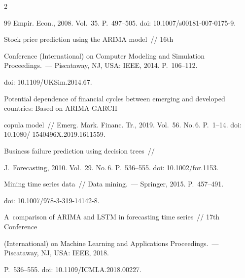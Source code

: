 \begin{multicols}{2}
{{\begin{thebibliography}{99}
Empir. Econ., 2008. Vol.~35. P.~497--505. doi: 10.1007/s00181-007-0175-9.





Stock price prediction using the ARIMA model~// 16th 

 Conference (International) on Computer Modeling and Simulation Proceedings.~--- Piscataway, NJ, USA: IEEE, 2014. P.~106--112. 

 doi: 10.1109/UKSim.2014.67.





Potential dependence of financial cycles between emerging and developed countries: Based on ARIMA-GARCH 

copula model~// Emerg. Mark. Financ. Tr., 2019. Vol.~56. No.\,6. P.~1--14. doi: 10.1080/ 1540496X.2019.1611559.







Business failure prediction using decision trees~//

J.~Forecasting, 2010. Vol.~29. No.\,6. P.~536--555. doi: 10.1002/for.1153.





Mining time series data~// Data mining.~--- Springer, 2015. P.~457--491. 

doi: 10.1007/978-3-319-14142-8.







A~comparison of ARIMA and LSTM in forecasting time series~//  17th Conference 

(International) on Machine Learning and Applications Proceedings.~--- Piscataway, NJ, USA: IEEE, 2018. 

P.~536--555. doi: 10.1109/ICMLA.2018.00227.







\end{thebibliography}}}
\end{multicols}
